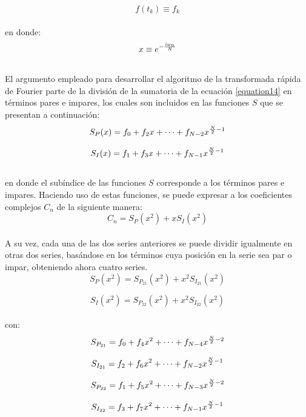 $$f(t_{k})\equiv f_{k}$$\\

\noindent en donde:\\

$$x\equiv e^{-{i\omega_{n}\over N}}$$\\

El argumento empleado para desarrollar el algoritmo de la transformada rápida de Fourier parte de la división de la sumatoria de la ecuación \ref{equation14} en términos pares e impares, los cuales son incluidos en las funciones $S$ que se presentan a continuación:\\ 

$$S_{P}(x)=f_{0}+f_{2}x+\cdots+f_{N-2}x^{{N\over 2} -1}$$

$$S_{I}(x)=f_{1}+f_{3}x+\cdots+f_{N-1}x^{{N\over 2} -1}$$\\

\noindent en donde el subíndice de las funciones $S$ corresponde a los términos pares e impares.
Haciendo uso de estas funciones, se puede expresar a los coeficientes complejos $C_{n}$ de la siguiente manera:\\

$$C_{n}=S_{P}\left( x^{2}\right) + xS_{I}\left( x^{2}\right)$$\\

A su vez, cada una de las dos series anteriores se puede dividir igualmente en otras dos series, basándose en los términos cuya posición en la serie sea par o impar, obteniendo ahora cuatro series.\\

$$S_{P}\left( x^{2}\right)=S_{P_{21}}\left( x^{2}\right) + x^{2}S_{I_{21}}\left( x^{2}\right)$$

$$S_{I}\left( x^{2}\right)=S_{P_{22}}\left( x^{2}\right) + x^{2}S_{I_{22}}\left( x^{2}\right)$$\\

\noindent con: \\

$$S_{P_{21}}=f_{0}+f_{4}x^{2}+\cdots+f_{N-4}x^{{N\over 2} -2}$$

$$S_{I_{21}}=f_{2}+f_{6}x^{2}+\cdots+f_{N-2}x^{{N\over 2} -1}$$

$$S_{P_{22}}=f_{1}+f_{5}x^{2}+\cdots+f_{N-3}x^{{N\over 2} -2}$$

$$S_{I_{22}}=f_{3}+f_{7}x^{2}+\cdots+f_{N-1}x^{{N\over 2} -1}$$\\

